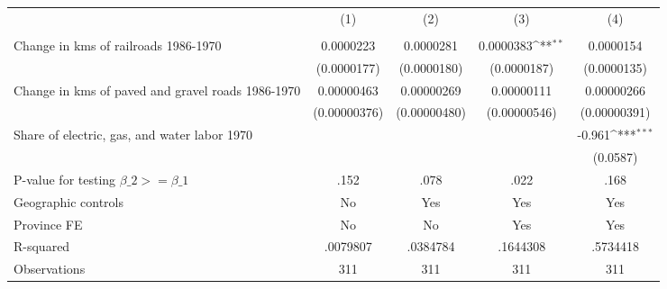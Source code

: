 {
\def\sym#1{\ifmmode^{#1}\else\(^{#1}\)\fi}
\begin{tabular}{l*{4}{c}}
\hline\hline
                &\multicolumn{1}{c}{(1)}&\multicolumn{1}{c}{(2)}&\multicolumn{1}{c}{(3)}&\multicolumn{1}{c}{(4)}\\
                &\multicolumn{1}{c}{}&\multicolumn{1}{c}{}&\multicolumn{1}{c}{}&\multicolumn{1}{c}{}\\
\hline
Change in kms of railroads 1986-1970&0.0000223         &0.0000281         &0.0000383\sym{**} &0.0000154         \\
                &(0.0000177)         &(0.0000180)         &(0.0000187)         &(0.0000135)         \\
[1em]
Change in kms of paved and gravel roads 1986-1970&0.00000463         &0.00000269         &0.00000111         &0.00000266         \\
                &(0.00000376)         &(0.00000480)         &(0.00000546)         &(0.00000391)         \\
[1em]
Share of electric, gas, and water labor 1970&                  &                  &                  &   -0.961\sym{***}\\
                &                  &                  &                  & (0.0587)         \\
\hline
P-value for testing $\beta\_{2} >= \beta\_{1}$&     .152         &     .078         &     .022         &     .168         \\
Geographic controls&       No         &      Yes         &      Yes         &      Yes         \\
Province FE     &       No         &       No         &      Yes         &      Yes         \\
R-squared       & .0079807         & .0384784         & .1644308         & .5734418         \\
Observations    &      311         &      311         &      311         &      311         \\
\hline\hline
\end{tabular}
}
